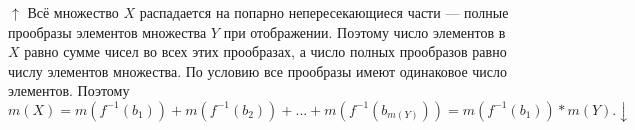 \documentclass{article}
\begin{document}
        \(\uparrow\) Всё множество \(X\) распадается на попарно непересекающиеся части --- полные прообразы элементов множества \(Y\) при отображении. Поэтому число элементов в \(X\) равно сумме чисел во всех этих прообразах, а число полных прообразов равно числу элементов множества. По условию все прообразы имеют одинаковое число элементов. Поэтому
        \[m(X) = m(f^{-1}(b_1)) + m(f^{-1}(b_2)) + ... + m(f^{-1}(b_{m(Y)})) = m(f^{-1}(b_1)) * m(Y). \downarrow\]
\end{document}
